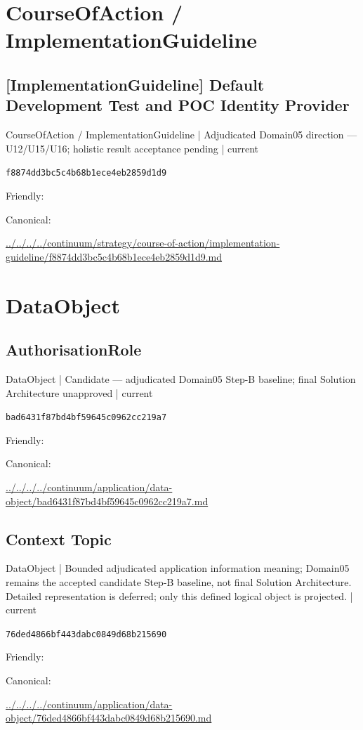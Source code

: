 \documentclass[10pt,a4paper]{article}
\begin{document}
\section*{CourseOfAction / ImplementationGuideline}
\subsection*{[ImplementationGuideline] Default Development Test and POC Identity Provider}
{\small CourseOfAction / ImplementationGuideline | Adjudicated Domain05 direction — U12/U15/U16; holistic result acceptance pending | current}\par
\texttt{f8874dd3bc5c4b68b1ece4eb2859d1d9}\par
Friendly: \par
Canonical: \par
{\footnotesize\url{../../../../continuum/strategy/course-of-action/implementation-guideline/f8874dd3bc5c4b68b1ece4eb2859d1d9.md}}\par
\section*{DataObject}
\subsection*{AuthorisationRole}
{\small DataObject | Candidate — adjudicated Domain05 Step-B baseline; final Solution Architecture unapproved | current}\par
\texttt{bad6431f87bd4bf59645c0962cc219a7}\par
Friendly: \par
Canonical: \par
{\footnotesize\url{../../../../continuum/application/data-object/bad6431f87bd4bf59645c0962cc219a7.md}}\par
\subsection*{Context Topic}
{\small DataObject | Bounded adjudicated application information meaning; Domain05 remains the accepted candidate Step-B baseline, not final Solution Architecture. Detailed representation is deferred; only this defined logical object is projected. | current}\par
\texttt{76ded4866bf443dabc0849d68b215690}\par
Friendly: \par
Canonical: \par
{\footnotesize\url{../../../../continuum/application/data-object/76ded4866bf443dabc0849d68b215690.md}}\par
\end{document}
